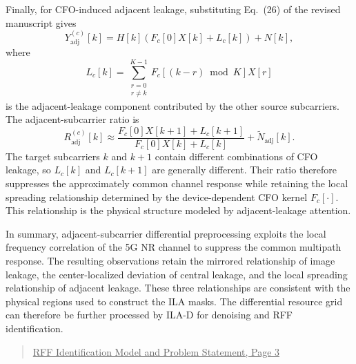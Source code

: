 \documentclass[onecolumn,11pt]{article}
\newcommand{\nc}[2]{\begin{quote}\underline{#1}\\ {\leavevmode\color{blue}{``#2"}}\end{quote}}
\begin{document}
{Finally, for CFO-induced adjacent leakage, substituting Eq.~(26) of the revised manuscript gives
\begin{equation}
Y_{\mathrm{adj}}^{(c)}[k]
=
H[k]\left(F_c[0]X[k]+L_c[k]\right)+N[k],
\end{equation}
where
\begin{equation}
L_c[k]
=
\sum_{\substack{r=0\\r\neq k}}^{K-1}
F_c\left[(k-r)\bmod K\right]X[r]
\end{equation}
is the adjacent-leakage component contributed by the other source subcarriers. The adjacent-subcarrier ratio is
\begin{equation}
R_{\mathrm{adj}}^{(c)}[k]
\approx
\frac{F_c[0]X[k+1]+L_c[k+1]}
{F_c[0]X[k]+L_c[k]}
+\widetilde{N}_{\mathrm{adj}}[k].
\end{equation}
The target subcarriers $k$ and $k+1$ contain different combinations of CFO leakage, so $L_c[k]$ and $L_c[k+1]$ are generally different. Their ratio therefore suppresses the approximately common channel response while retaining the local spreading relationship determined by the device-dependent CFO kernel $F_c[\cdot]$. This relationship is the physical structure modeled by adjacent-leakage attention.

In summary, adjacent-subcarrier differential preprocessing exploits the local frequency correlation of the 5G NR channel to suppress the common multipath response. The resulting observations retain the mirrored relationship of image leakage, the center-localized deviation of central leakage, and the local spreading relationship of adjacent leakage. These three relationships are consistent with the physical regions used to construct the ILA masks. The differential resource grid can therefore be further processed by ILA-D for denoising and RFF identification.


\nc{RFF Identification Model and Problem Statement, Page 3}
{Although an AWGN channel is considered in this paper to isolate the effect of noise, ILA-D can also be applied in multipath environments combined with channel-suppression techniques. Owing to the narrow subcarrier spacing of 5G NR and the local frequency correlation of wireless channels, adjacent subcarriers within the coherence bandwidth experience similar channel responses. Existing differential preprocessing methods can therefore suppress the common channel response while retaining transmitter-specific distortions~[26], [27], after which the channel-suppressed signals can be processed by ILA-D.}
}
\end{document}
